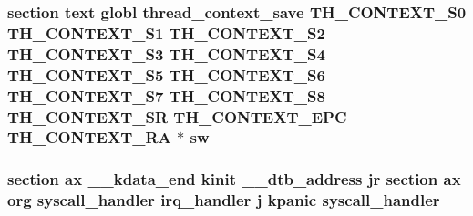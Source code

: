 \hypertarget{mips_2entry_8S_a50257344f74ff9744ffcbbcac96a8f4c}{
\subsubsection[{sw}]{\setlength{\rightskip}{0pt plus 5cm}section text globl {\bf thread\-\_\-context\-\_\-save} {\bf T\-H\-\_\-\-C\-O\-N\-T\-E\-X\-T\-\_\-\-S0} {\bf T\-H\-\_\-\-C\-O\-N\-T\-E\-X\-T\-\_\-\-S1} {\bf T\-H\-\_\-\-C\-O\-N\-T\-E\-X\-T\-\_\-\-S2} {\bf T\-H\-\_\-\-C\-O\-N\-T\-E\-X\-T\-\_\-\-S3} {\bf T\-H\-\_\-\-C\-O\-N\-T\-E\-X\-T\-\_\-\-S4} {\bf T\-H\-\_\-\-C\-O\-N\-T\-E\-X\-T\-\_\-\-S5} {\bf T\-H\-\_\-\-C\-O\-N\-T\-E\-X\-T\-\_\-\-S6} {\bf T\-H\-\_\-\-C\-O\-N\-T\-E\-X\-T\-\_\-\-S7} {\bf T\-H\-\_\-\-C\-O\-N\-T\-E\-X\-T\-\_\-\-S8} {\bf T\-H\-\_\-\-C\-O\-N\-T\-E\-X\-T\-\_\-\-S\-R} {\bf T\-H\-\_\-\-C\-O\-N\-T\-E\-X\-T\-\_\-\-E\-P\-C} {\bf T\-H\-\_\-\-C\-O\-N\-T\-E\-X\-T\-\_\-\-R\-A} $\ast$ sw}}\label{mips_2entry_8S_a50257344f74ff9744ffcbbcac96a8f4c}
\hypertarget{mips_2entry_8S_a37916740c132fd7bd4e7a87888d28df0}{
\subsubsection[{syscall\-\_\-handler}]{\setlength{\rightskip}{0pt plus 5cm}section ax {\bf \-\_\-\-\_\-kdata\-\_\-end} {\bf kinit} \-\_\-\-\_\-dtb\-\_\-address jr section ax org syscall\-\_\-handler {\bf irq\-\_\-handler} j {\bf kpanic} syscall\-\_\-handler}}\label{mips_2entry_8S_a37916740c132fd7bd4e7a87888d28df0}
